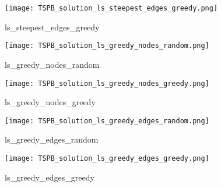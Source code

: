 \newpage

\begin{figure}[!htbp]
\centering
\texttt{[image: TSPB\_solution\_ls\_steepest\_edges\_greedy.png]}
\caption{\label{fig:frog}ls\_steepest\_edges\_greedy}
\end{figure}

\begin{figure}[!htbp]
\centering
\texttt{[image: TSPB\_solution\_ls\_greedy\_nodes\_random.png]}
\caption{\label{fig:frog}ls\_greedy\_nodes\_random}
\end{figure}

\begin{figure}[!htbp]
\centering
\texttt{[image: TSPB\_solution\_ls\_greedy\_nodes\_greedy.png]}
\caption{\label{fig:frog}ls\_greedy\_nodes\_greedy}
\end{figure}

\begin{figure}[!htbp]
\centering
\texttt{[image: TSPB\_solution\_ls\_greedy\_edges\_random.png]}
\caption{\label{fig:frog}ls\_greedy\_edges\_random}
\end{figure}

\begin{figure}[!htbp]
\centering
\texttt{[image: TSPB\_solution\_ls\_greedy\_edges\_greedy.png]}
\caption{\label{fig:frog}ls\_greedy\_edges\_greedy}
\end{figure}
